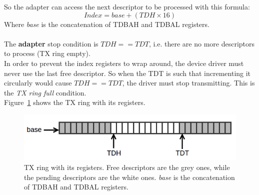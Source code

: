 \documentclass[a4paper, 12pt, titlepage]{report}
\begin{document}
So the adapter can access the next descriptor to be processed with this formula:
$$Index = base + (TDH \times 16)$$
Where \textit{base} is the concatenation of TDBAH and TDBAL registers.
\\
\\
The \textbf{adapter} stop condition is \begin{math}TDH == TDT \end{math}, i.e. there are no more descriptors to process (TX ring empty).
\\
In order to prevent the index registers to wrap around, the device driver must never use the last free descriptor. So when the TDT is such that incrementing it circularly would cause \begin{math}TDH == TDT \end{math}, the driver must stop transmitting. This is the \textit{TX ring full} condition.
\\
Figure~\ref{img:tx_ring} shows the TX ring with its registers.
\begin{figure}[!h] 
	\centering
	\includegraphics[scale=0.6]{img/tx_ring.png}
	\caption{TX ring with its registers. Free descriptors are the grey ones, while the pending descriptors are the white ones. \textit{base} is the concatenation of TDBAH and TDBAL registers.}
	\label{img:tx_ring}
\end{figure}
\end{document}
